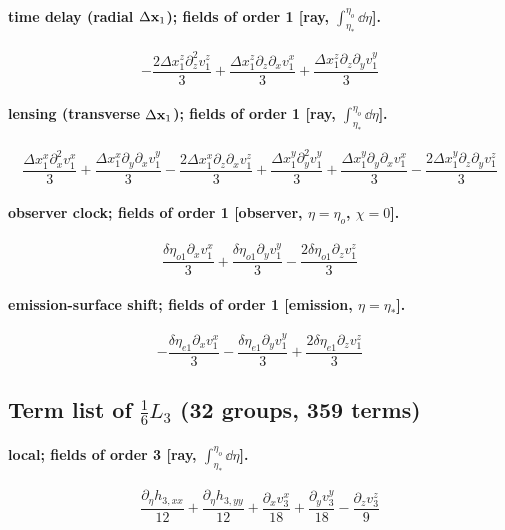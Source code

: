 \paragraph{time delay (radial $\Delta\mathbf x_1$); fields of order 1 [ray, $\int_{\eta_*}^{\eta_o}\dd\eta$].}
\begin{dmath*}- \frac{2 {\Delta x^{z}_{1}} \partial_{z}^{2}  {v^{z}_{1}}}{3} + \frac{{\Delta x^{z}_{1}} \partial_{z}\partial_{x}  {v^{x}_{1}}}{3} + \frac{{\Delta x^{z}_{1}} \partial_{z}\partial_{y}  {v^{y}_{1}}}{3}\end{dmath*}
\paragraph{lensing (transverse $\Delta\mathbf x_1$); fields of order 1 [ray, $\int_{\eta_*}^{\eta_o}\dd\eta$].}
\begin{dmath*}\frac{{\Delta x^{x}_{1}} \partial_{x}^{2}  {v^{x}_{1}}}{3} + \frac{{\Delta x^{x}_{1}} \partial_{y}\partial_{x}  {v^{y}_{1}}}{3} - \frac{2 {\Delta x^{x}_{1}} \partial_{z}\partial_{x}  {v^{z}_{1}}}{3} + \frac{{\Delta x^{y}_{1}} \partial_{y}^{2}  {v^{y}_{1}}}{3} + \frac{{\Delta x^{y}_{1}} \partial_{y}\partial_{x}  {v^{x}_{1}}}{3} - \frac{2 {\Delta x^{y}_{1}} \partial_{z}\partial_{y}  {v^{z}_{1}}}{3}\end{dmath*}
\paragraph{observer clock; fields of order 1 [observer, $\eta=\eta_o$, $\chi=0$].}
\begin{dmath*}\frac{\delta\eta_{o1} \partial_x  {v^{x}_{1}}}{3} + \frac{\delta\eta_{o1} \partial_y  {v^{y}_{1}}}{3} - \frac{2 \delta\eta_{o1} \partial_z  {v^{z}_{1}}}{3}\end{dmath*}
\paragraph{emission-surface shift; fields of order 1 [emission, $\eta=\eta_*$].}
\begin{dmath*}- \frac{\delta\eta_{e1} \partial_x  {v^{x}_{1}}}{3} - \frac{\delta\eta_{e1} \partial_y  {v^{y}_{1}}}{3} + \frac{2 \delta\eta_{e1} \partial_z  {v^{z}_{1}}}{3}\end{dmath*}
\subsection*{Term list of $\tfrac16L_3$ (32 groups, 359 terms)}
\paragraph{local; fields of order 3 [ray, $\int_{\eta_*}^{\eta_o}\dd\eta$].}
\begin{dmath*}\frac{\partial_\eta  h_{3,xx}}{12} + \frac{\partial_\eta  h_{3,yy}}{12} + \frac{\partial_x  {v^{x}_{3}}}{18} + \frac{\partial_y  {v^{y}_{3}}}{18} - \frac{\partial_z  {v^{z}_{3}}}{9}\end{dmath*}
